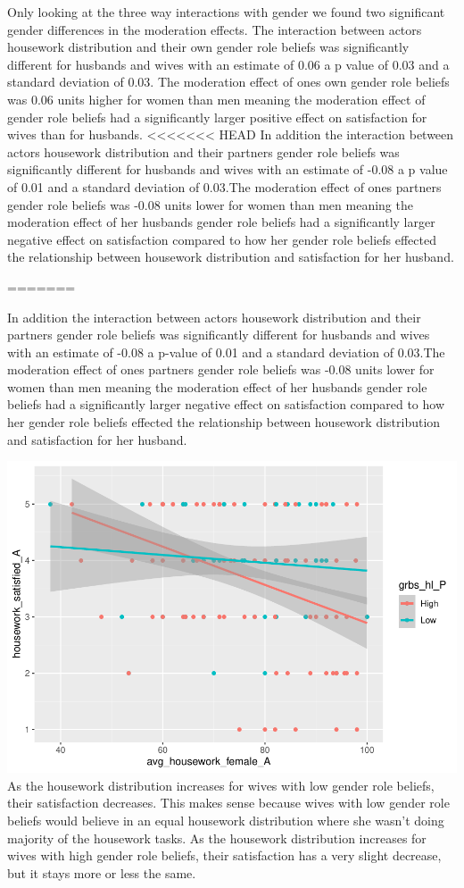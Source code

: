 \documentclass[
  man,floatsintext]{apa6}
\begin{document}
Only looking at the three way interactions with gender we found two significant gender differences in the moderation effects. The interaction between actors housework distribution and their own gender role beliefs was significantly different for husbands and wives with an estimate of 0.06 a p value of 0.03 and a standard deviation of 0.03. The moderation effect of ones own gender role beliefs was 0.06 units higher for women than men meaning the moderation effect of gender role beliefs had a significantly larger positive effect on satisfaction for wives than for husbands.
<<<<<<< HEAD
In addition the interaction between actors housework distribution and their partners gender role beliefs was significantly different for husbands and wives with an estimate of -0.08 a p value of 0.01 and a standard deviation of 0.03.The moderation effect of ones partners gender role beliefs was -0.08 units lower for women than men meaning the moderation effect of her husbands gender role beliefs had a significantly larger negative effect on satisfaction compared to how her gender role beliefs effected the relationship between housework distribution and satisfaction for her husband.






=======

In addition the interaction between actors housework distribution and their partners gender role beliefs was significantly different for husbands and wives with an estimate of -0.08 a p-value of 0.01 and a standard deviation of 0.03.The moderation effect of ones partners gender role beliefs was -0.08 units lower for women than men meaning the moderation effect of her husbands gender role beliefs had a significantly larger negative effect on satisfaction compared to how her gender role beliefs effected the relationship between housework distribution and satisfaction for her husband.

\includegraphics{results_files/figure-latex/unnamed-chunk-9-1.pdf}
As the housework distribution increases for wives with low gender role beliefs, their satisfaction decreases. This makes sense because wives with low gender role beliefs would believe in an equal housework distribution where she wasn't doing majority of the housework tasks. As the housework distribution increases for wives with high gender role beliefs, their satisfaction has a very slight decrease, but it stays more or less the same.
\end{document}
